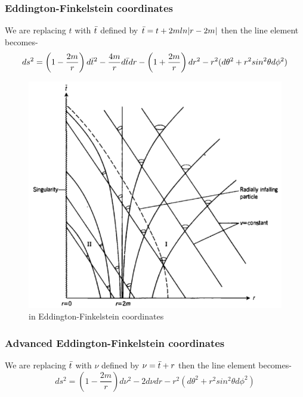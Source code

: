 \documentclass[12pt,a4paper]{article}
\numberwithin{table}{section}
\numberwithin{figure}{section}
\numberwithin{equation}{section}
\theoremstyle{remark}
\theoremstyle{definition}
\begin{document}
\subsubsection*{Eddington-Finkelstein coordinates}
We are replacing $t$ with $\Bar{t}$ defined by $\Bar{t}=t+2mln|r-2m|$ then the line element becomes-
\begin{equation}
    ds^2=\left(1-\dfrac{2m}{r}\right)d\Bar{t}^2-\dfrac{4m}{r}d\Bar{t}dr-\left(1+\frac{2m}{r}\right)dr^2-r^{2}(d\theta^2+r^{2}sin^2\theta d\phi^2)
\end{equation}
\begin{figure}[H]
    \centering
  \includegraphics[scale=0.6]{st3}
  \caption{in Eddington-Finkelstein coordinates}
  \label{fig:deviation}
\end{figure}
\subsubsection*{Advanced Eddington-Finkelstein coordinates}
We are replacing $\Bar{t}$ with $\nu$ defined by $\nu=\Bar{t}+r$ then the line element becomes-
\begin{equation}
    ds^2=\left(1-\dfrac{2m}{r}\right)d\nu^2-2d\nu dr -r^{2}(d\theta^2+r^{2}sin^2\theta d\phi^2)
\end{equation}
\end{document}
